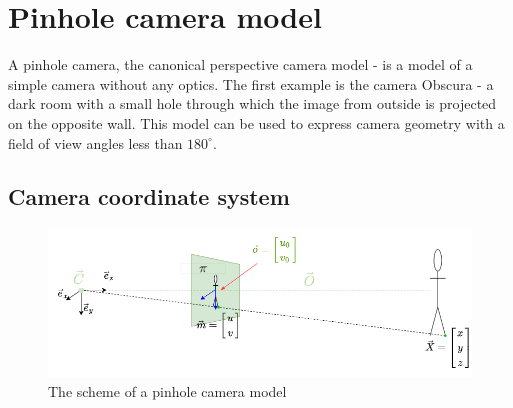 


\section{Pinhole camera model}
A pinhole camera, the canonical perspective camera model - is a model of a simple camera without any optics.
The first example is the camera Obscura - a dark room with a small hole through which the image from outside is projected on the opposite wall. 
This model can be used to express camera geometry with a field of view angles less than $180^{\circ}$.

\subsection{Camera coordinate system}
\begin{figure}[h]
    \centering
    \includegraphics[width=1\textwidth]{graphics/td_scene.png}
    \caption{The scheme of a pinhole camera model}
    \label{fig:td_scene_3d}
\end{figure}

